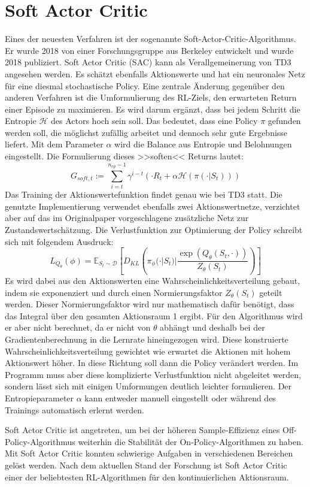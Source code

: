 \section{Soft Actor Critic}
\label{section:sac}
Eines der neuesten Verfahren ist der sogenannte Soft-Actor-Critic-Algorithmus.
Er wurde 2018 von einer Forschungsgruppe aus Berkeley entwickelt und wurde 2018 publiziert. \cite{haarnoja2018soft}
Soft Actor Critic (SAC) kann als Verallgemeinerung von TD3 angesehen werden.
Es schätzt ebenfalls Aktionswerte und hat ein neuronales Netz für eine diesmal stochastische Policy.
Eine zentrale Änderung gegenüber den anderen Verfahren ist die Umformulierung des RL-Ziels, den erwarteten Return einer Episode zu maximieren.
Es wird darum ergänzt, dass bei jedem Schritt die Entropie $\mathcal{H}$ des Actors hoch sein soll.
Das bedeutet, dass eine Policy $\pi$ gefunden werden soll, die möglichst zufällig arbeitet und dennoch sehr gute Ergebnisse liefert.
Mit dem Parameter $\alpha$ wird die Balance aus Entropie und Belohnungen eingestellt.
Die Formulierung dieses >>soften<< Returns lautet:
\begin{equation}
	G_{soft,t} := \sum_{i=t}^{n_{ep} - 1} \gamma^{i - t} (\cdot R_t + \alpha \mathcal{H}(\pi(\cdot | S_t)))
\end{equation}
Das Training der Aktionswertefunktion findet genau wie bei TD3 statt.
Die genutzte Implementierung verwendet ebenfalls zwei Aktionswertnetze, verzichtet aber auf das im Originalpaper vorgeschlagene zusätzliche Netz zur Zustandswertschätzung. \cite{stable-baselines}
Die Verlustfunktion zur Optimierung der Policy schreibt sich mit folgendem Ausdruck:
\begin{equation}
	L_{Q_\theta}(\phi) = \mathbb{E}_{S_t \sim \mathcal{D}} \left[D_{KL}\left(\pi_\phi(\cdot | S_t) | \frac{\exp(Q_\theta(S_t, \cdot))}{Z_\theta(S_t)}\right)\right]
\end{equation}
Es wird dabei aus den Aktionswerten eine Wahrscheinlichkeitsverteilung gebaut, indem sie exponenziert und durch einen Normierungsfaktor $Z_\theta(S_t)$ geteilt werden.
Dieser Normierungsfaktor wird nur mathematisch dafür benötigt, dass das Integral über den gesamten Aktionsraum 1 ergibt.
Für den Algorithmus wird er aber nicht berechnet, da er nicht von $\theta$ abhängt und deshalb bei der Gradientenberechnung in die Lernrate hineingezogen wird.
Diese konstruierte Wahrscheinlichkeitsverteilung gewichtet wie erwartet die Aktionen mit hohem Aktionswert höher.
In diese Richtung soll dann die Policy verändert werden.
Im Programm muss aber diese komplizierte Verlustfunktion nicht abgeleitet werden, sondern lässt sich mit einigen Umformungen deutlich leichter formulieren.
Der Entropieparameter $\alpha$ kann entweder manuell eingestellt oder während des Trainings automatisch erlernt werden. \cite{https://doi.org/10.48550/arxiv.1812.05905}

Soft Actor Critic ist angetreten, um bei der höheren Sample-Effizienz eines Off-Policy-Algorithmus weiterhin die Stabilität der On-Policy-Algorithmen zu haben.
Mit Soft Actor Critic konnten schwierige Aufgaben in verschiedenen Bereichen gelöst werden.
Nach dem aktuellen Stand der Forschung ist Soft Actor Critic einer der beliebtesten RL-Algorithmen für den kontinuierlichen Aktionsraum.
